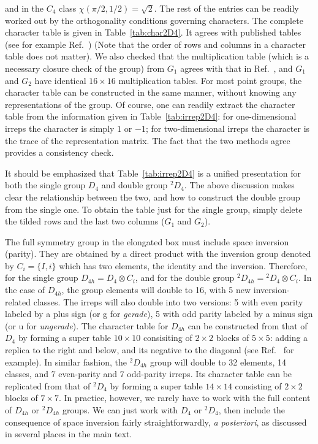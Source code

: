 \documentclass[aps,prd,reprint,showpacs,floatfix,longbibliography,,superscriptaddress]{revtex4-1}
\begin{document}
\begin{widetext}
and in the ${C}_4$ class $\chi(\pi/2,1/2)=\sqrt{2}$.
The rest of the entries can be readily worked out by the orthogonality conditions governing  characters. 
The complete character table is given in Table~\ref{tab:char2D4}. 
It agrees with published tables (see for example Ref.~\cite{Altmann:1994}) 
(Note that the order of rows and columns in a character table does not matter).
We also checked that the multiplication table (which is a necessary closure check of the group) 
from $G_1$ agrees with that in Ref.~\cite{Altmann:1994}, 
and $G_1$ and $G_2$ have identical $16\times 16$  multiplication tables.
For most point groups, the character table can be constructed in the same manner, without knowing any representations of the group. Of course, one can readily extract the character table from the information 
given in Table~\ref{tab:irrep2D4}: for one-dimensional irreps the character is simply $1$ or $-1$; 
for two-dimensional irreps the character is the trace of the representation matrix.  
The fact that the two methods agree provides a consistency check.

It should be emphasized that Table~\ref{tab:irrep2D4} is a unified presentation for both the single group $D_4$ and double group $^2D_4$. The above discussion makes clear the relationship between the two, and how to 
construct the double group from the single one. To obtain the table just for the single group, 
simply delete the tilded rows and the last two columns ($G_1$ and $G_2$).

The full symmetry group in the elongated box must include space inversion (parity).
They are obtained by a direct product with the inversion group denoted by $C_i=\{I,i\}$ which has two elements, 
the identity and the inversion.
Therefore, for the single group $D_{4h} = D_4 \otimes C_i$, 
 and for the double group $^2D_{4h} = {^2D_4}\otimes C_i$.
 In the case of $D_{4h}$, the group elements will double to 16, with 5 new inversion-related classes.
The irreps will also double into two versions: 5 with even parity labeled by a plus sign (or g for {\it gerade}), 
5 with odd parity labeled by a minus sign (or u for {\it ungerade}). 
The character table for $D_{4h}$ can be constructed from that of $D_4$ by forming a super table $10\times 10$ consisiting 
of $2\times 2$  blocks of $5\times 5$:
adding a replica to the right and below, and its negative to the diagonal (see Ref.~\cite{Altmann:1994} for example).   
In similar fashion, the $^2D_{4h}$ group will double to 32 elements, 14 classes, and 7 even-parity and 7 odd-parity irreps. Its character table can be replicated from that of $^2D_4$ by forming a super table $14\times 14$ consisting of $2\times 2$ blocks of $7\times 7$.
In practice, however, we rarely have to work with the full content of $D_{4h}$ or $^2D_{4h}$ groups.
We can just work with  $D_{4}$  or $^2D_{4}$,  then include the consequence of space inversion 
fairly straightforwardly, {\it a posteriori}, as discussed in several places in the main text.


\end{widetext}
\end{document}
